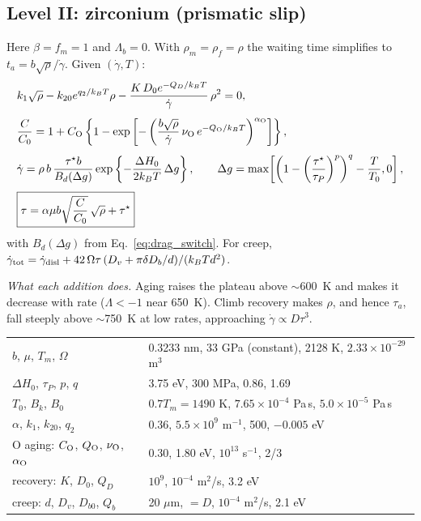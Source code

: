 \documentclass[11pt]{article}
\newcommand{\gd}{\dot\gamma}
\newcommand{\ts}{\tau^{\star}}
\newcommand{\kT}{k_BT}
\numberwithin{equation}{section}
\begin{document}
\subsection{Level II: zirconium (prismatic slip)}
\begin{matbox}
Here $\beta=f_m=1$ and $\Lambda_b=0$. With $\rho_m=\rho_f=\rho$ the waiting time simplifies to $t_a=b\sqrt\rho/\gd$. Given $(\gd,T)$:
\begin{align}
&k_1\sqrt\rho-k_{20}e^{q_2/\kT}\rho-\frac{K\,D_0e^{-Q_D/\kT}}{\gd}\,\rho^2=0,\\[4pt]
&\frac{C}{C_0}=1+C_{\rm O}\left\{1-\exp\left[-\left(\frac{b\sqrt\rho}{\gd}\,\nu_{\rm O}\,e^{-Q_{\rm O}/\kT}\right)^{\alpha_{\rm O}}\right]\right\},\\[4pt]
&\gd=\rho\,b\,\frac{\ts b}{B_d(\Delta g)}\exp\left\{-\frac{\Delta H_0}{2\kT}\,\Delta g\right\},\qquad
\Delta g=\max\!\left[\left(1-\left(\frac{\ts}{\tau_P}\right)^{p}\right)^{q}-\frac{T}{T_0},0\right],\\[4pt]
&\boxed{\tau=\alpha\mu b\sqrt{\frac{C}{C_0}}\,\sqrt\rho+\ts}
\end{align}
with $B_d(\Delta g)$ from Eq.~\eqref{eq:drag_switch}. For creep, $\gd_{\rm tot}=\gd_{\rm disl}+42\,\Omega\tau\,(D_v+\pi\delta D_b/d)/(\kT d^2)$.

\emph{What each addition does.} Aging raises the plateau above $\sim$600~K and makes it decrease with rate ($\Lambda<-1$ near 650~K). Climb recovery makes $\rho$, and hence $\tau_a$, fall steeply above $\sim$750~K at low rates, approaching $\gd\propto D\tau^3$.

\medskip
\begin{tabular}{@{}ll@{}}
\toprule
$b$, $\mu$, $T_m$, $\Omega$ & 0.3233 nm, 33 GPa (constant), 2128 K, $2.33\times10^{-29}$ m$^3$\\
$\Delta H_0$, $\tau_P$, $p$, $q$ & 3.75 eV, 300 MPa, 0.86, 1.69\\
$T_0$, $B_k$, $B_0$ & $0.7T_m=1490$ K, $7.65\times10^{-4}$ Pa\,s, $5.0\times10^{-5}$ Pa\,s\\
$\alpha$, $k_1$, $k_{20}$, $q_2$ & 0.36, $5.5\times10^9$ m$^{-1}$, 500, $-0.005$ eV\\
O aging: $C_{\rm O}$, $Q_{\rm O}$, $\nu_{\rm O}$, $\alpha_{\rm O}$ & 0.30, 1.80 eV, $10^{13}$ s$^{-1}$, 2/3\\
recovery: $K$, $D_0$, $Q_D$ & $10^9$, $10^{-4}$ m$^2$/s, 3.2 eV\\
creep: $d$, $D_v$, $D_{b0}$, $Q_b$ & 20 $\mu$m, $=D$, $10^{-4}$ m$^2$/s, 2.1 eV\\
\bottomrule
\end{tabular}
\end{matbox}
\end{document}
